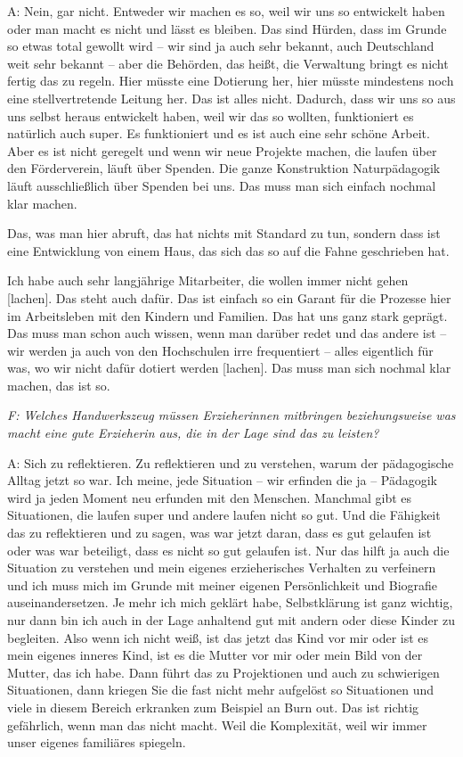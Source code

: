 \begin{linenumbers}
A: Nein, gar nicht. Entweder wir machen es so, weil wir uns so entwickelt haben oder man macht es nicht und lässt es bleiben. Das sind Hürden, dass im Grunde so etwas total gewollt wird -- wir sind ja auch sehr bekannt, auch Deutschland weit sehr bekannt -- aber die Behörden, das heißt, die Verwaltung bringt es nicht fertig das zu regeln. Hier müsste eine Dotierung her, hier müsste mindestens noch eine stellvertretende Leitung her. Das ist alles nicht. Dadurch, dass wir uns so aus uns selbst heraus entwickelt haben, weil wir das so wollten, funktioniert es natürlich auch super. Es funktioniert und es ist auch eine sehr schöne Arbeit. Aber es ist nicht geregelt und wenn wir neue Projekte machen, die laufen über den Förderverein, läuft über Spenden. Die ganze Konstruktion Naturpädagogik läuft ausschließlich über Spenden bei uns.
Das muss man sich einfach nochmal klar machen. 

Das, was man hier abruft, das hat nichts mit Standard zu tun, sondern dass ist eine Entwicklung von einem Haus, das sich das so auf die Fahne geschrieben hat.
 
Ich habe auch sehr langjährige Mitarbeiter, die wollen immer nicht gehen [lachen]. Das steht auch dafür. Das ist einfach so ein Garant für die Prozesse hier im Arbeitsleben mit den Kindern und Familien. Das hat uns ganz stark geprägt. Das muss man schon auch wissen, wenn man darüber redet und das andere ist -- wir werden ja auch von den Hochschulen irre frequentiert -- alles eigentlich für was, wo wir nicht dafür dotiert werden [lachen]. Das muss man sich nochmal klar machen, das ist so.

\emph{F: Welches Handwerkszeug müssen Erzieherinnen mitbringen beziehungsweise was macht eine gute Erzieherin aus, die in der Lage sind das zu leisten?}

A: Sich zu reflektieren. Zu reflektieren und zu verstehen, warum der pädagogische Alltag jetzt so war. Ich meine, jede Situation -- wir erfinden die ja -- Pädagogik wird ja jeden Moment neu erfunden mit den Menschen. Manchmal gibt es Situationen, die laufen super und andere laufen nicht so gut. Und die Fähigkeit das zu reflektieren und zu sagen, was war jetzt daran, dass es gut gelaufen ist oder was war beteiligt, dass es nicht so gut gelaufen ist. Nur das hilft ja auch die Situation zu verstehen und mein eigenes erzieherisches Verhalten zu verfeinern und ich muss mich im Grunde mit meiner eigenen Persönlichkeit und Biografie auseinandersetzen. Je mehr ich mich geklärt habe, Selbstklärung ist ganz wichtig, nur dann bin ich auch in der Lage anhaltend gut mit andern oder diese Kinder zu begleiten. Also wenn ich nicht weiß, ist das jetzt das Kind vor mir oder ist es mein eigenes inneres Kind, ist es die Mutter vor mir oder mein Bild von der Mutter, das ich habe. Dann führt das zu Projektionen und auch zu schwierigen Situationen, dann kriegen Sie die fast nicht mehr aufgelöst so Situationen und viele in diesem Bereich erkranken zum Beispiel an Burn out. Das ist richtig gefährlich, wenn man das nicht macht. Weil die Komplexität, weil wir immer unser eigenes familiäres spiegeln. 


\end{linenumbers}
